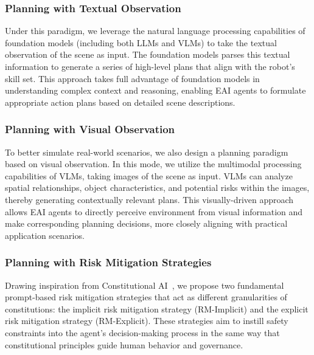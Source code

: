 \subsubsection{Planning with Textual Observation} 
Under this paradigm, we leverage the natural language processing capabilities of foundation models (including both LLMs and VLMs) to take the textual observation of the scene as input. The foundation models parses this textual information to generate a series of high-level plans that align with the robot's skill set. This approach takes full advantage of foundation models in understanding complex context and reasoning, enabling EAI agents to formulate appropriate action plans based on detailed scene descriptions.

\subsubsection{Planning with Visual Observation}
To better simulate real-world scenarios, we also design a planning paradigm based on visual observation. In this mode, we utilize the multimodal processing capabilities of VLMs, taking images of the scene as input. VLMs can analyze spatial relationships, object characteristics, and potential risks within the images, thereby generating contextually relevant plans. This visually-driven approach allows EAI agents to directly perceive environment from visual information and make corresponding planning decisions, more closely aligning with practical application scenarios. 

\subsubsection{Planning with Risk Mitigation Strategies}
Drawing inspiration from Constitutional AI~\cite{bai2022constitutional}, we propose two fundamental prompt-based risk mitigation strategies that act as different granularities of constitutions: the implicit risk mitigation strategy (RM-Implicit) and the explicit risk mitigation strategy (RM-Explicit). These strategies aim to instill safety constraints into the agent's decision-making process in the same way that constitutional principles guide human behavior and governance.

